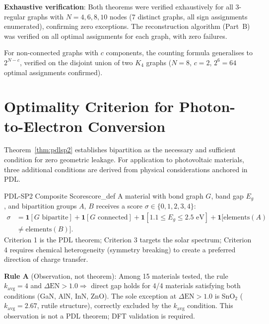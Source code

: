 \documentclass[12pt,a4paper]{article}
\newcommand{\DEN}{\Delta\mathrm{EN}}
\begin{document}
\textbf{Exhaustive verification}: Both theorems were verified
exhaustively for all 3-regular graphs with $N = 4, 6, 8, 10$ nodes
(7 distinct graphs, all sign assignments enumerated), confirming
zero exceptions. The reconstruction algorithm (Part~B) was verified on
all optimal assignments for each graph, with zero failures.

For non-connected graphs with $c$ components, the counting formula
generalises to $2^{N-c}$, verified on the disjoint union of two $K_4$
graphs ($N=8$, $c=2$, $2^6 = 64$ optimal assignments confirmed).

\section{Optimality Criterion for Photon-to-Electron Conversion}
\label{sec:criterion}

Theorem~\ref{thm:pdlsp2} establishes bipartition as the necessary and
sufficient condition for zero geometric leakage. For application to
photovoltaic materials, three additional conditions are derived from
physical considerations anchored in PDL.

\begin{definition}{PDL-SP2 Composite Score}{score_def}
A material with bond graph $G$, band gap $E_g$, and bipartition
groups $A$, $B$ receives a score $\sigma \in \{0,1,2,3,4\}$:
\begin{align*}
  \sigma &= \mathbf{1}[G\text{ bipartite}]
           + \mathbf{1}[G\text{ connected}]
           + \mathbf{1}[1.1 \leq E_g \leq 2.5\text{ eV}]
           + \mathbf{1}[\text{elements}(A) \\ &\neq \text{elements}(B)].
\end{align*}
Criterion 1 is the PDL theorem; Criterion 3 targets the solar spectrum;
Criterion 4 requires chemical heterogeneity (symmetry breaking) to
create a preferred direction of charge transfer.
\end{definition}

\textbf{Rule A} (Observation, not theorem): Among 15 materials tested,
the rule $k_{\mathrm{avg}} = 4$ and $\DEN > 1.0 \Rightarrow$ direct gap
holds for 4/4 materials satisfying both conditions (GaN, AlN, InN, ZnO).
The sole exception at $\DEN > 1.0$ is SnO$_2$ ($k_{\mathrm{avg}} = 2.67$,
rutile structure), correctly excluded by the $k_{\mathrm{avg}}$ condition.
This observation is not a PDL theorem; DFT validation is required.

\end{document}
